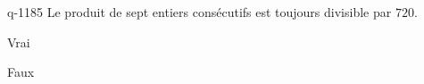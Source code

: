 \begin{truefalse}{q-1185}
Le produit de sept entiers consécutifs est toujours divisible par $720$.
\item* Vrai
\item Faux
\end{truefalse}

